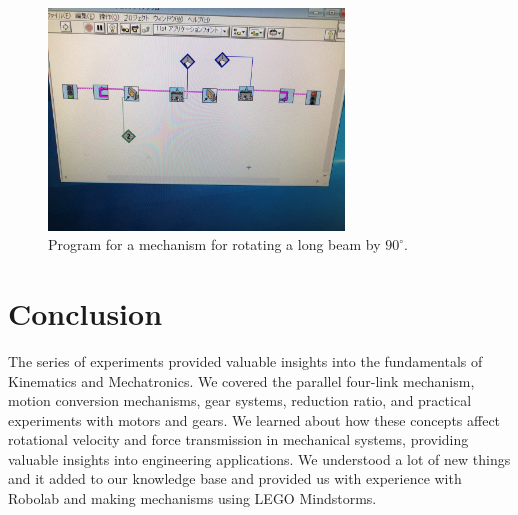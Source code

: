 \documentclass[12pt,a4paper]{report}
\begin{document}
\begin{figure}[htbp]
        \centering
    \includegraphics[width=0.7\textwidth]{figures/ass17-2}
    \caption{Program for a mechanism for rotating a long beam by $90^{\circ}$.}
    \label{fig:ass17-2}
\end{figure}

\section{Conclusion}
The series of experiments provided valuable insights into the fundamentals of Kinematics and Mechatronics. 
We covered the parallel four-link mechanism, motion conversion mechanisms, gear systems, reduction ratio, and practical 
experiments with motors and gears. We learned about how these concepts affect rotational velocity and force transmission in 
mechanical systems, providing valuable insights into engineering applications. We understood a lot of new things and it 
added to our knowledge base and provided us with experience with Robolab and making mechanisms using LEGO Mindstorms. 

\listoffigures
\end{document}
